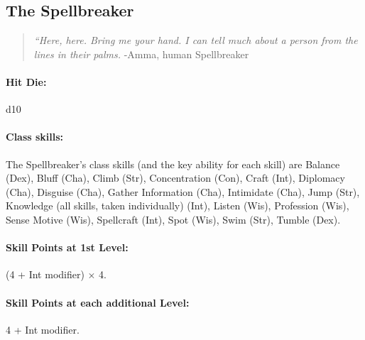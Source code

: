 \subsection[Spellbreaker]{The Spellbreaker}
\label{sec:Spellbreaker}
\begin{quote}
\emph{``Here, here. Bring me your hand. I can tell much about a person from the lines in their palms.}
-Amma, human Spellbreaker
\end{quote}

\paragraph{Hit Die:} d10
\paragraph{Class skills:}
The Spellbreaker's class skills (and the key ability for each skill) are Balance (Dex), Bluff (Cha), Climb (Str), Concentration (Con), Craft (Int), Diplomacy (Cha), Disguise (Cha), Gather Information (Cha), Intimidate (Cha), Jump (Str), Knowledge (all skills, taken individually) (Int), Listen (Wis), Profession (Wis), Sense Motive (Wis), Spellcraft (Int), Spot (Wis), Swim (Str), Tumble (Dex).

\paragraph{Skill Points at 1st Level:} (4 + Int modifier) $\times$ 4.
\paragraph{Skill Points at each additional Level:} 4 + Int modifier.


